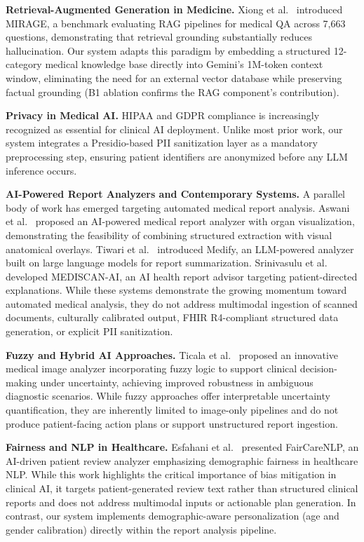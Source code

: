 \documentclass[conference]{IEEEtran}
\begin{document}
\textbf{Retrieval-Augmented Generation in Medicine.}
Xiong et al.\ \cite{xiong2024mirage} introduced MIRAGE, a benchmark evaluating RAG
pipelines for medical QA across 7,663 questions, demonstrating that retrieval grounding
substantially reduces hallucination. Our system adapts this paradigm by embedding a
structured 12-category medical knowledge base directly into Gemini's 1M-token context
window, eliminating the need for an external vector database while preserving factual
grounding (B1 ablation confirms the RAG component's contribution).

\textbf{Privacy in Medical AI.}
HIPAA and GDPR compliance is increasingly recognized as essential for clinical AI
deployment. Unlike most prior work, our system integrates a Presidio-based PII
sanitization layer \cite{microsoftpresidio} as a mandatory preprocessing step,
ensuring patient identifiers are anonymized before any LLM inference occurs.

\textbf{AI-Powered Report Analyzers and Contemporary Systems.}
A parallel body of work has emerged targeting automated medical report analysis.
Aswani et al.\ \cite{aswani2025aimedical, aswani2025intelligent} proposed an
AI-powered medical report analyzer with organ visualization, demonstrating the
feasibility of combining structured extraction with visual anatomical overlays.
Tiwari et al.\ \cite{tiwari2026medify} introduced Medify, an LLM-powered analyzer
built on large language models for report summarization. Srinivasulu et al.\
\cite{srinivasulu2025mediscan} developed MEDISCAN-AI, an AI health report advisor
targeting patient-directed explanations. While these systems demonstrate the growing
momentum toward automated medical analysis, they do not address multimodal ingestion
of scanned documents, culturally calibrated output, FHIR R4-compliant structured
data generation, or explicit PII sanitization.

\textbf{Fuzzy and Hybrid AI Approaches.}
Ticala et al.\ \cite{ticala2025fuzzy} proposed an innovative medical image analyzer
incorporating fuzzy logic to support clinical decision-making under uncertainty, achieving
improved robustness in ambiguous diagnostic scenarios. While fuzzy approaches offer
interpretable uncertainty quantification, they are inherently limited to image-only
pipelines and do not produce patient-facing action plans or support unstructured report
ingestion.

\textbf{Fairness and NLP in Healthcare.}
Esfahani et al.\ \cite{esfahani2026faircare} presented FairCareNLP, an AI-driven
patient review analyzer emphasizing demographic fairness in healthcare NLP. While
this work highlights the critical importance of bias mitigation in clinical AI,
it targets patient-generated review text rather than structured clinical reports
and does not address multimodal inputs or actionable plan generation. In contrast,
our system implements demographic-aware personalization (age and gender calibration)
directly within the report analysis pipeline.
\end{document}
